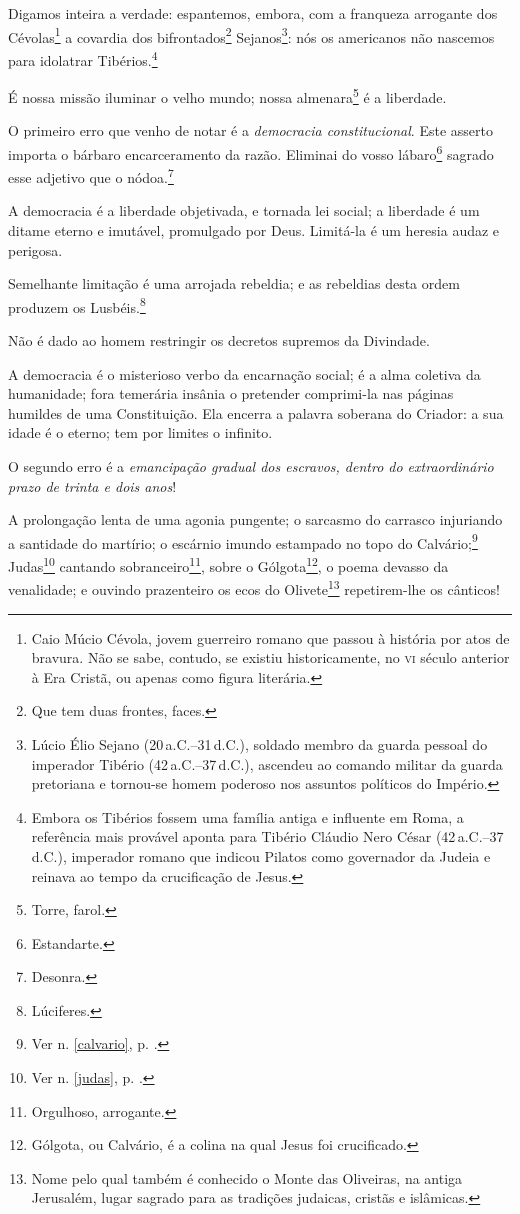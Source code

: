 Digamos inteira a verdade: espantemos, embora, com a franqueza arrogante
dos Cévolas\footnote{Caio Múcio Cévola, jovem guerreiro romano que
  passou à história por atos de bravura. Não se sabe, contudo, se
  existiu historicamente, no \textsc{vi} século anterior à Era Cristã, ou apenas
  como figura literária.} a covardia dos bifrontados\footnote{Que tem
  duas frontes, faces.} Sejanos\footnote{Lúcio Élio Sejano (20\,a.C.--31\,d.C.), 
  soldado membro da guarda pessoal do imperador Tibério (42\,a.C.--37\,d.C.), 
  ascendeu ao comando militar da guarda pretoriana e tornou-se
  homem poderoso nos assuntos políticos do Império.}: nós os americanos
não nascemos para idolatrar Tibérios.\footnote{Embora os Tibérios
  fossem uma família antiga e influente em Roma, a referência mais
  provável aponta para Tibério Cláudio Nero César (42\,a.C.--37\,d.C.),
  imperador romano que indicou Pilatos como governador da Judeia e
  reinava ao tempo da crucificação de Jesus.}

É nossa missão iluminar o velho mundo; nossa almenara\footnote{Torre,
  farol.} é a liberdade.

O primeiro erro que venho de notar é a \emph{democracia constitucional}.
Este asserto importa o bárbaro encarceramento da razão. Eliminai do
vosso lábaro\footnote{Estandarte.} sagrado esse adjetivo que o
nódoa.\footnote{Desonra.}

A democracia é a liberdade objetivada, e tornada lei social; a liberdade
é um ditame eterno e imutável, promulgado por Deus. Limitá-la é um
heresia audaz e perigosa.

Semelhante limitação é uma arrojada rebeldia; e as rebeldias desta ordem
produzem os Lusbéis.\footnote{Lúciferes.}

Não é dado ao homem restringir os decretos supremos da Divindade.

A democracia é o misterioso verbo da encarnação social; é a alma
coletiva da humanidade; fora temerária insânia o pretender comprimi-la
nas páginas humildes de uma Constituição. Ela encerra a palavra soberana
do Criador: a sua idade é o eterno; tem por limites o infinito.

O segundo erro é a \emph{emancipação gradual dos escravos, dentro do
extraordinário prazo de trinta e dois anos}!

A prolongação lenta de uma agonia pungente; o sarcasmo do carrasco
injuriando a santidade do martírio; o escárnio imundo estampado no topo
do Calvário;\footnote{Ver n. \ref{calvario}, p. \pageref{calvario}.} 
Judas\footnote{Ver n. \ref{judas}, p. \pageref{judas}.} 
  cantando sobranceiro\footnote{Orgulhoso, arrogante.}, sobre
o Gólgota\footnote{Gólgota, ou Calvário, é a colina na qual Jesus foi
  crucificado.}, o poema devasso da venalidade; e ouvindo prazenteiro os
ecos do Olivete\footnote{Nome pelo qual também é conhecido o Monte das
  Oliveiras, na antiga Jerusalém, lugar sagrado para as tradições
  judaicas, cristãs e islâmicas.} repetirem-lhe os cânticos!

